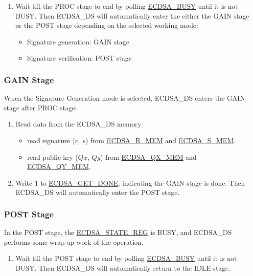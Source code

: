 \documentclass[main\_\_EN.tex]{subfiles}
\begin{document}
\begin{enumerate}
	\item Wait till the PROC stage to end by polling \hyperref[fielddesc:ECDSABUSY]{ECDSA\_BUSY} until it is not BUSY. Then ECDSA\_DS will automatically enter the either the GAIN stage or the POST stage depending on the selected working mode:
	      \begin{itemize}
		      \item Signature generation: GAIN stage
		      \item Signature verification: POST stage
	      \end{itemize}
\end{enumerate}

\subsubsection{GAIN Stage}

When the Signature Generation mode is selected, ECDSA\_DS enters the GAIN stage after PROC stage:

\begin{enumerate}
	\item Read data from the ECDSA\_DS memory:
	      \begin{itemize}
		      \item read signature ($r$, $s$) from \hyperref[tab:ecdsa-memory]{ECDSA\_R\_MEM} and \hyperref[tab:ecdsa-memory]{ECDSA\_S\_MEM}.
		      \item read public key ($Qx$, $Qy$) from \hyperref[tab:ecdsa-memory]{ECDSA\_QX\_MEM} and \hyperref[tab:ecdsa-memory]{ECDSA\_QY\_MEM}.
	      \end{itemize}
	\item Write 1 to \hyperref[fielddesc:ECDSAGETDONE]{ECDSA\_GET\_DONE}, indicating the GAIN stage is done. Then ECDSA\_DS will automatically enter the POST stage.
\end{enumerate}

\subsubsection{POST Stage}

In the POST stage, the \hyperref[regdesc:ECDSASTATEREG]{ECDSA\_STATE\_REG} is BUSY, and ECDSA\_DS performs some wrap-up work of the operation.

\begin{enumerate}
    \item Wait till the POST stage to end by polling \hyperref[fielddesc:ECDSABUSY]{ECDSA\_BUSY} until it is not BUSY. Then ECDSA\_DS will automatically return to the IDLE stage.
\end{enumerate}
\end{document}
